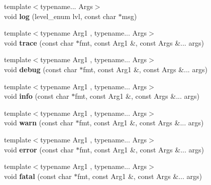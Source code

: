 \begin{DoxyCompactItemize}
{\footnotesize template$<$typename... Args$>$ }\\void {\bfseries log} (level\+\_\+enum lvl, const char $\ast$msg)
\item 
\mbox{\label{classlogging_1_1Logger_afcabd701258eb21fff6065fbbec482ee}} 
{\footnotesize template$<$typename Arg1 , typename... Args$>$ }\\void {\bfseries trace} (const char $\ast$fmt, const Arg1 \&, const Args \&... args)
\item 
\mbox{\label{classlogging_1_1Logger_a6b6b5a5a46d0fa86dda1f0ead94d11d9}} 
{\footnotesize template$<$typename Arg1 , typename... Args$>$ }\\void {\bfseries debug} (const char $\ast$fmt, const Arg1 \&, const Args \&... args)
\item 
\mbox{\label{classlogging_1_1Logger_a9e84f520b4d0d59767c703cfa42892a3}} 
{\footnotesize template$<$typename Arg1 , typename... Args$>$ }\\void {\bfseries info} (const char $\ast$fmt, const Arg1 \&, const Args \&... args)
\item 
\mbox{\label{classlogging_1_1Logger_aa8ee4ba78a72ed8d34a810cd2b8013c7}} 
{\footnotesize template$<$typename Arg1 , typename... Args$>$ }\\void {\bfseries warn} (const char $\ast$fmt, const Arg1 \&, const Args \&... args)
\item 
\mbox{\label{classlogging_1_1Logger_a2c966ec22aaa7ec6378b2542a9f27cce}} 
{\footnotesize template$<$typename Arg1 , typename... Args$>$ }\\void {\bfseries error} (const char $\ast$fmt, const Arg1 \&, const Args \&... args)
\item 
\mbox{\label{classlogging_1_1Logger_a629b17f9522d324db02a91c83464dae3}} 
{\footnotesize template$<$typename Arg1 , typename... Args$>$ }\\void {\bfseries fatal} (const char $\ast$fmt, const Arg1 \&, const Args \&... args)
\item 
\mbox{\label{classlogging_1_1Logger_a38c3ad77f938400f56e4a10dc9c8e9e8}} 

\end{DoxyCompactItemize}

